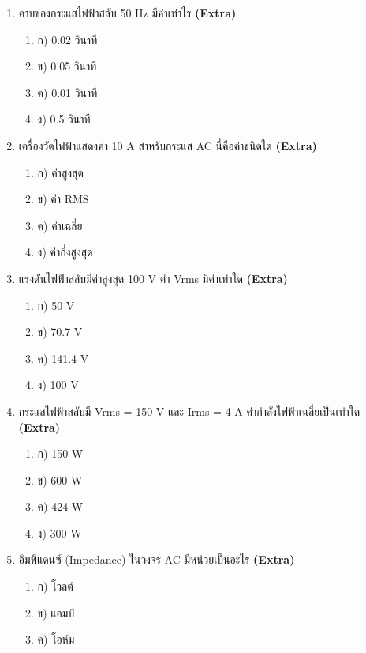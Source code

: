 \documentclass[12pt]{article}
\begin{document}
\begin{enumerate}[label=\arabic*.]
\begin{enumerate}[label=)]
\item ก) 110 V
\item ข) 220 V
\item ค) 311 V
\item ง) 440 V
\end{enumerate}
\item คาบของกระแสไฟฟ้าสลับ 50 Hz มีค่าเท่าไร \hfill \textbf{\small (Extra)}
\begin{enumerate}[label=)]
\item ก) 0.02 วินาที
\item ข) 0.05 วินาที
\item ค) 0.01 วินาที
\item ง) 0.5 วินาที
\end{enumerate}
\item เครื่องวัดไฟฟ้าแสดงค่า 10 A สำหรับกระแส AC นี่คือค่าชนิดใด \hfill \textbf{\small (Extra)}
\begin{enumerate}[label=)]
\item ก) ค่าสูงสุด
\item ข) ค่า RMS
\item ค) ค่าเฉลี่ย
\item ง) ค่ากึ่งสูงสุด
\end{enumerate}
\item แรงดันไฟฟ้าสลับมีค่าสูงสุด 100 V ค่า Vrms มีค่าเท่าใด \hfill \textbf{\small (Extra)}
\begin{enumerate}[label=)]
\item ก) 50 V
\item ข) 70.7 V
\item ค) 141.4 V
\item ง) 100 V
\end{enumerate}
\item กระแสไฟฟ้าสลับมี Vrms = 150 V และ Irms = 4 A ค่ากำลังไฟฟ้าเฉลี่ยเป็นเท่าใด \hfill \textbf{\small (Extra)}
\begin{enumerate}[label=)]
\item ก) 150 W
\item ข) 600 W
\item ค) 424 W
\item ง) 300 W
\end{enumerate}
\item อิมพีแดนซ์ (Impedance) ในวงจร AC มีหน่วยเป็นอะไร \hfill \textbf{\small (Extra)}
\begin{enumerate}[label=)]
\item ก) โวลต์
\item ข) แอมป์
\item ค) โอห์ม

\end{enumerate}
\end{enumerate}
\end{document}
